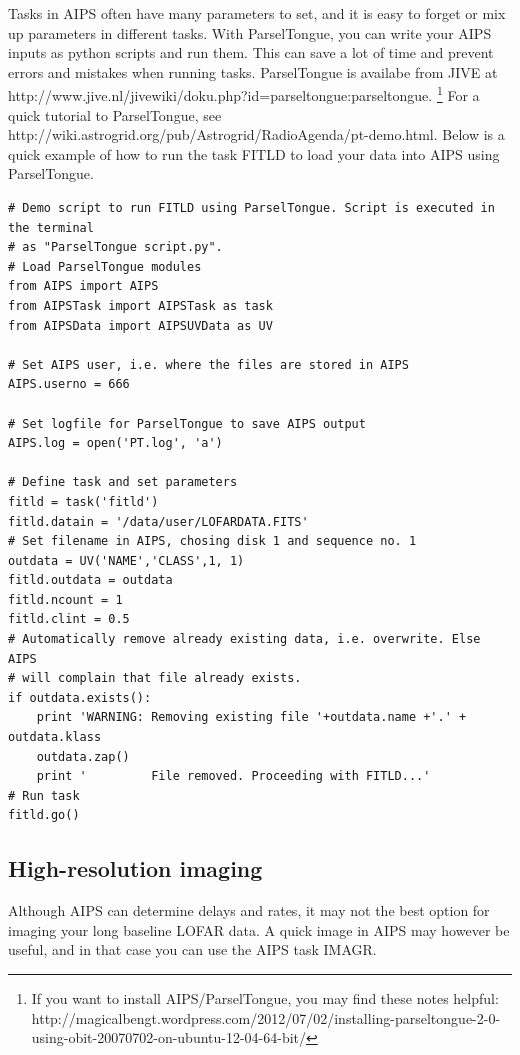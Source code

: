 Tasks in AIPS often have many parameters to set, and it is easy to 
forget or mix up parameters in different tasks. With ParselTongue, you can write your AIPS inputs
as python scripts and run them. This can save a lot of time and prevent errors and mistakes
when running tasks. ParselTongue is availabe from JIVE at http://www.jive.nl/jivewiki/doku.php?id=parseltongue:parseltongue.
\footnote{If you want to install AIPS/ParselTongue, you may find these notes helpful:
http://magicalbengt.wordpress.com/2012/07/02/installing-parseltongue-2-0-using-obit-20070702-on-ubuntu-12-04-64-bit/}
For a quick tutorial to ParselTongue, see http://wiki.astrogrid.org/pub/Astrogrid/RadioAgenda/pt-demo.html.
Below is a quick example of how to run the task FITLD to load your data into AIPS using ParselTongue. 

\begin{lstlisting}
# Demo script to run FITLD using ParselTongue. Script is executed in the terminal
# as "ParselTongue script.py". 
# Load ParselTongue modules
from AIPS import AIPS
from AIPSTask import AIPSTask as task
from AIPSData import AIPSUVData as UV

# Set AIPS user, i.e. where the files are stored in AIPS
AIPS.userno = 666

# Set logfile for ParselTongue to save AIPS output
AIPS.log = open('PT.log', 'a')

# Define task and set parameters
fitld = task('fitld')
fitld.datain = '/data/user/LOFARDATA.FITS'
# Set filename in AIPS, chosing disk 1 and sequence no. 1
outdata = UV('NAME','CLASS',1, 1)
fitld.outdata = outdata
fitld.ncount = 1
fitld.clint = 0.5
# Automatically remove already existing data, i.e. overwrite. Else AIPS
# will complain that file already exists.
if outdata.exists():
    print 'WARNING: Removing existing file '+outdata.name +'.' + outdata.klass
    outdata.zap()
    print '         File removed. Proceeding with FITLD...'
# Run task
fitld.go()
\end{lstlisting}

\subsection{High-resolution imaging}
Although AIPS can determine delays and rates, it may not the best option for
imaging your long baseline LOFAR data. A quick image in AIPS may however
be useful, and in that case you can use the AIPS task IMAGR.

